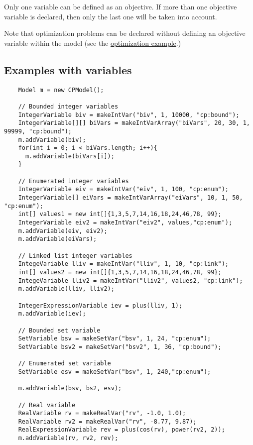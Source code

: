 Only one variable can be defined as an objective. If more than one objective variable is declared, then only the last one will be taken into account.

Note that optimization problems can be declared without defining an objective variable within the model (see the \hyperlink{solver:optimization}{optimization example}.)

\subsection{Examples with variables}\label{model:exampleswithvariables}\hypertarget{model:exampleswithvariables}{}
\begin{lstlisting}
	Model m = new CPModel();
	
	// Bounded integer variables
	IntegerVariable biv = makeIntVar("biv", 1, 10000, "cp:bound");
	IntegerVariable[][] biVars = makeIntVarArray("biVars", 20, 30, 1, 99999, "cp:bound");
	m.addVariable(biv);
	for(int i = 0; i < biVars.length; i++){
	  m.addVariable(biVars[i]);
	}
	
	// Enumerated integer variables
	IntegerVariable eiv = makeIntVar("eiv", 1, 100, "cp:enum");
	IntegerVariable[] eiVars = makeIntVarArray("eiVars", 10, 1, 50, "cp:enum");
	int[] values1 = new int[]{1,3,5,7,14,16,18,24,46,78, 99};
	IntegerVariable eiv2 = makeIntVar("eiv2", values,"cp:enum");
	m.addVariable(eiv, eiv2);
	m.addVariable(eiVars);
	
	// Linked list integer variables
	IntegeVariable lliv = makeIntVar("lliv", 1, 10, "cp:link");
	int[] values2 = new int[]{1,3,5,7,14,16,18,24,46,78, 99};
	IntegeVariable lliv2 = makeIntVar("lliv2", values2, "cp:link");
	m.addVariable(lliv, lliv2);
	
	IntegerExpressionVariable iev = plus(lliv, 1);
	m.addVariable(iev);
	
	// Bounded set variable
	SetVariable bsv = makeSetVar("bsv", 1, 24, "cp:enum");
	SetVariable bsv2 = makeSetVar("bsv2", 1, 36, "cp:bound");
	
	// Enumerated set variable
	SetVariable esv = makeSetVar("bsv", 1, 240,"cp:enum");
	
	m.addVariable(bsv, bs2, esv);
	
	// Real variable
	RealVariable rv = makeRealVar("rv", -1.0, 1.0);
	RealVariable rv2 = makeRealVar("rv", -8.77, 9.87);
	RealExpressionVariable rev = plus(cos(rv), power(rv2, 2));
	m.addVariable(rv, rv2, rev);
\end{lstlisting}

